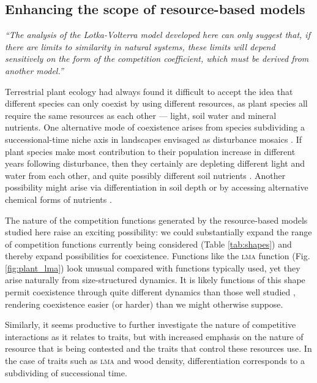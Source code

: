 \documentclass[a4paper,11pt]{article}
\begin{document}
\subsection{Enhancing the scope of resource-based models}

\emph{``The analysis of the Lotka-Volterra model developed here can only
suggest that, if there are limits to similarity in natural systems, these
limits will depend sensitively on the form of the competition coefficient,
which must be derived from another model.''}\citep{Abrams-1975}

Terrestrial plant ecology had always found it difficult to accept the
idea that different species can only coexist by using different
resources, as plant species all require the same resources as each other ---
light, soil water and mineral nutrients. One alternative mode of coexistence
arises from species subdividing a successional-time niche axis in
landscapes envisaged as disturbance mosaics \citep{Connell-1978}. If
plant species make most contribution to their population increase in
different years following disturbance, then they certainly are
depleting different light and water from each other, and quite
possibly different soil nutrients \citep{Moorcroft-2001}. Another
possibility might arise via differentiation in soil depth or by accessing
alternative chemical forms of nutrients \citep{Tilman-1977}.

The nature of the competition functions generated by the
resource-based models studied here raise an exciting possibility: we
could substantially expand the range of competition functions
currently being considered (Table \ref{tab:shapes}) and thereby expand
possibilities for coexistence. Functions like the \textsc {lma} function
(Fig. \ref{fig:plant_lma}) look unusual compared with functions
typically used, yet they arise naturally from size-structured
dynamics.  It is likely functions of this shape permit coexistence
through quite different dynamics than those well studied
\citep[e.g.][]{Leimar-2013}, rendering coexistence easier (or harder)
than we might otherwise suppose.

Similarly, it seems productive to further investigate the nature of
competitive interactions as it relates to traits, but with increased
emphasis on the nature of resource that is being contested and the traits that control these resources use. In the
case of traits such as \textsc{lma} and wood density, differentiation
corresponds to a subdividing of successional time.
\end{document}
